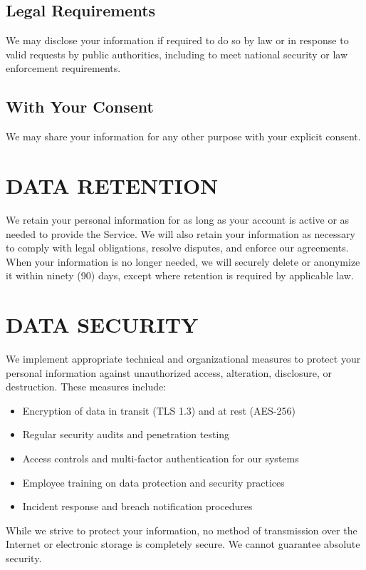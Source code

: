 \documentclass[
    language=english,
    doctype=privacy-policy,
    institution=none,
]{../../omnilatex}
\begin{document}
\subsection{Legal Requirements}
We may disclose your information if required to do so by law or in response to valid requests by public authorities, including to meet national security or law enforcement requirements.

\subsection{With Your Consent}
We may share your information for any other purpose with your explicit consent.

\section{DATA RETENTION}

We retain your personal information for as long as your account is active or as needed to provide the Service. We will also retain your information as necessary to comply with legal obligations, resolve disputes, and enforce our agreements. When your information is no longer needed, we will securely delete or anonymize it within ninety (90) days, except where retention is required by applicable law.

\section{DATA SECURITY}

We implement appropriate technical and organizational measures to protect your personal information against unauthorized access, alteration, disclosure, or destruction. These measures include:

\begin{itemize}
    \item Encryption of data in transit (TLS 1.3) and at rest (AES-256)
    \item Regular security audits and penetration testing
    \item Access controls and multi-factor authentication for our systems
    \item Employee training on data protection and security practices
    \item Incident response and breach notification procedures
\end{itemize}

While we strive to protect your information, no method of transmission over the Internet or electronic storage is completely secure. We cannot guarantee absolute security.
\end{document}
